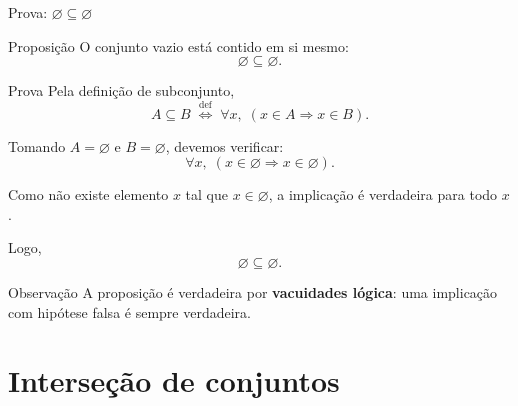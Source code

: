 \documentclass[9pt]{beamer}
\begin{document}
\begin{frame}{Prova: $\varnothing \subseteq \varnothing$}

\begin{block}{Proposição}
O conjunto vazio está contido em si mesmo:
\[
\varnothing \subseteq \varnothing.
\]
\end{block}

\begin{block}{Prova}
Pela definição de subconjunto,
\[
A \subseteq B 
\;\stackrel{\text{def}}{\Longleftrightarrow}\;
\forall x,\; (x \in A \Rightarrow x \in B).
\]

Tomando $A = \varnothing$ e $B = \varnothing$, devemos verificar:
\[
\forall x,\; (x \in \varnothing \Rightarrow x \in \varnothing).
\]

Como não existe elemento $x$ tal que $x \in \varnothing$,  
a implicação é verdadeira para todo $x$.

Logo,
\[
\varnothing \subseteq \varnothing.
\]
\end{block}

\begin{block}{Observação} 
A proposição é verdadeira por \textbf{vacuidades lógica}:  
uma implicação com hipótese falsa é sempre verdadeira.
\end{block}

\end{frame}
\section{Interseção de conjuntos}
\end{document}
